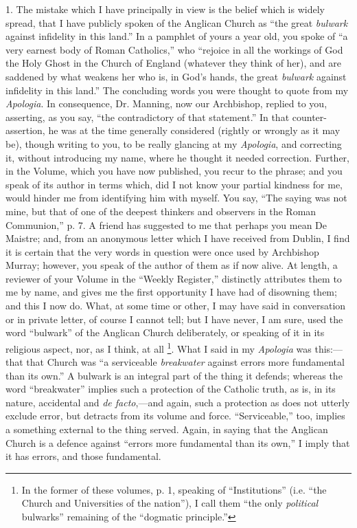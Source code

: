 1. The mistake which I have principally in view is the belief which
is widely spread, that I have publicly spoken of the Anglican Church as
``the great \emph{bulwark} against infidelity in this land.'' In
a pamphlet of yours a year old, you spoke of ``a very earnest body
of Roman Catholics,'' who ``rejoice in all the workings of
God the Holy Ghost in the Church of England (whatever they think of
her), and are saddened by what weakens her who is, in God's hands, the
great \emph{bulwark} against infidelity in this land.'' The
concluding words you were thought to quote from my \emph{Apologia}. In
consequence, Dr. Manning, now our Archbishop, replied to you, asserting,
as you say, ``the contradictory of that statement.'' In that
counter-assertion, he was at the time generally considered (rightly or
wrongly as it may be), though writing to you, to be really glancing at
my \emph{Apologia}, and correcting it, without introducing my name,
where he thought it needed correction. Further, in the Volume, which you
have now published, you recur to the phrase; and you speak of its author
in terms which, did I not know your partial kindness for me, would
hinder me from identifying him with myself. You say, ``The saying
was not mine, but that of one of the deepest thinkers and observers in
the Roman Communion,'' p. 7. A friend has suggested to me that
perhaps you mean De Maistre; and, from an anonymous letter which I have
received from Dublin, I find it is certain that the very words in
question were once used by Archbishop Murray; however, you speak of the
author of them as if now alive. At length, a reviewer of your Volume in
the ``Weekly Register,'' distinctly attributes them to me by
name, and gives me the first opportunity I have had of disowning them;
and this I now do. What, at some time or other, I may have said in
conversation or in private letter, of course I cannot tell; but I have
never, I am sure, used the word ``bulwark'' of the Anglican
Church deliberately, or speaking of it in its religious aspect, nor, as
I think, at all \footnote{In the former of these volumes, p. 1, speaking of
``Institutions'' (i.e. ``the Church and Universities of the
nation''), I call them ``the only \emph{political}
bulwarks'' remaining of the ``dogmatic principle.''}. What I
said in my \emph{Apologia} was this:—that that Church was ``a
serviceable \emph{breakwater} against errors more fundamental than its
own.'' A bulwark is an integral part of the thing it defends;
whereas the word ``breakwater'' implies such a protection of the
Catholic truth, as is, in its nature, accidental and \emph{de facto},—and
again, such a protection as does not utterly exclude error, but detracts
from its volume and force. ``Serviceable,'' too, implies a
something external to the thing served. Again, in saying that the
Anglican Church is a defence against ``errors more fundamental than
its own,'' I imply that it has errors, and those fundamental.

